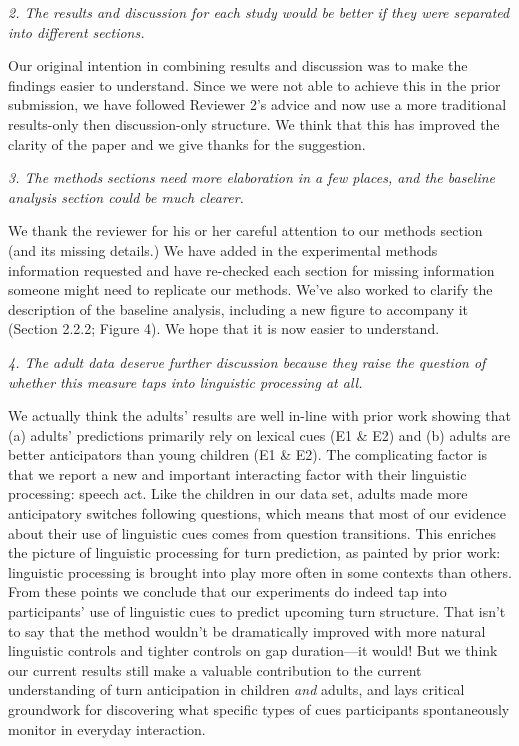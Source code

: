 \documentclass[11pt,a4paper]{letter} %
\begin{document}
\begin{letter}{}
\smallskip

\noindent \textit{2. The results and discussion for each study would be better if they were separated into different sections.}

\noindent Our original intention in combining results and discussion was to make the findings easier to understand. Since we were not able to achieve this in the prior submission, we have followed Reviewer 2's advice and now use a more traditional results-only then discussion-only structure. We think that this has improved the clarity of the paper and we give thanks for the suggestion. 

\smallskip

\noindent \textit{3. The methods sections need more elaboration in a few places, and the baseline analysis section could be much clearer.}

\noindent We thank the reviewer for his or her careful attention to our methods section (and its missing details.) We have added in the experimental methods information requested and have re-checked each section for missing information someone might need to replicate our methods. We've also worked to clarify the description of the baseline analysis, including a new figure to accompany it (Section 2.2.2; Figure 4). We hope that it is now easier to understand.

\smallskip

\noindent \textit{4. The adult data deserve further discussion because they raise the question of whether this measure taps into linguistic processing at all.}

\noindent We actually think the adults' results are well in-line with prior work showing that (a) adults' predictions primarily rely on lexical cues (E1 \& E2) and (b) adults are better anticipators than young children (E1 \& E2). The complicating factor is that we report a new and important interacting factor with their linguistic processing: speech act. Like the children in our data set, adults made more anticipatory switches following questions, which means that most of our evidence about their use of linguistic cues comes from question transitions. This enriches the picture of linguistic processing for turn prediction, as painted by prior work: linguistic processing is brought into play more often in some contexts than others. From these points we conclude that our experiments do indeed tap into participants' use of linguistic cues to predict  upcoming turn structure. That isn't to say that the method wouldn't be dramatically improved with more natural linguistic controls and tighter controls on gap duration---it would! But we think our current results still make a valuable contribution to the current understanding of turn anticipation in children \textit{and} adults, and lays critical groundwork for discovering what specific types of cues participants spontaneously monitor in everyday interaction.


\end{letter}
\end{document}
